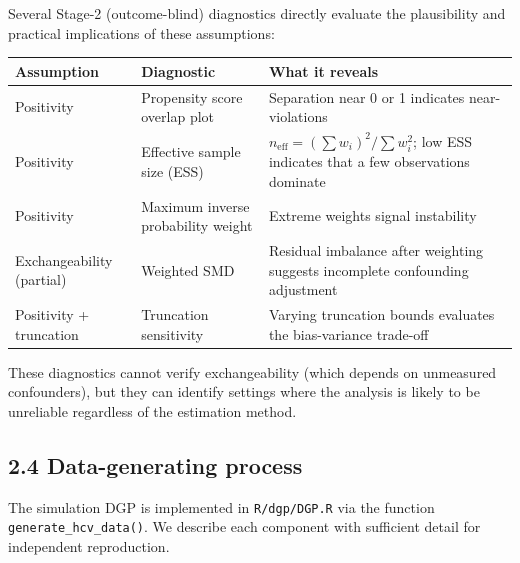 \documentclass[
  letterpaper,
  DIV=11,
  numbers=noendperiod]{scrartcl}
\begin{document}
Several Stage-2 (outcome-blind) diagnostics directly evaluate the
plausibility and practical implications of these assumptions:

\begin{longtable}[]{@{}
  >{\raggedright\arraybackslash}p{}
  >{\raggedright\arraybackslash}p{}
  >{\raggedright\arraybackslash}p{}@{}}
\toprule\noalign{}
\begin{minipage}[b]{\linewidth}\raggedright
Assumption
\end{minipage} & \begin{minipage}[b]{\linewidth}\raggedright
Diagnostic
\end{minipage} & \begin{minipage}[b]{\linewidth}\raggedright
What it reveals
\end{minipage} \\
\midrule\noalign{}
\endhead
\bottomrule\noalign{}
\endlastfoot
Positivity & Propensity score overlap plot & Separation near 0 or 1
indicates near-violations \\
Positivity & Effective sample size (ESS) &
\(n_{\text{eff}} = (\sum w_i)^2 / \sum w_i^2\); low ESS indicates that a
few observations dominate \\
Positivity & Maximum inverse probability weight & Extreme weights signal
instability \\
Exchangeability (partial) & Weighted SMD & Residual imbalance after
weighting suggests incomplete confounding adjustment \\
Positivity + truncation & Truncation sensitivity & Varying truncation
bounds evaluates the bias-variance trade-off \\
\end{longtable}

These diagnostics cannot verify exchangeability (which depends on
unmeasured confounders), but they can identify settings where the
analysis is likely to be unreliable regardless of the estimation method.

\subsection{2.4 Data-generating process}\label{data-generating-process}

The simulation DGP is implemented in \texttt{R/dgp/DGP.R} via the
function \texttt{generate\_hcv\_data()}. We describe each component with
sufficient detail for independent reproduction.
\end{document}
